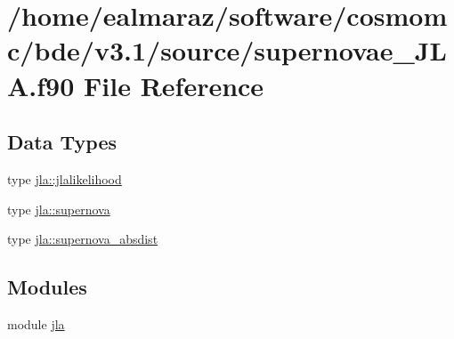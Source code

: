 \hypertarget{supernovae__JLA_8f90}{}\section{/home/ealmaraz/software/cosmomc/bde/v3.1/source/supernovae\+\_\+\+J\+LA.f90 File Reference}
\label{supernovae__JLA_8f90}
\subsection*{Data Types}
\begin{DoxyCompactItemize}
\item 
type \mbox{\hyperlink{structjla_1_1jlalikelihood}{jla\+::jlalikelihood}}
\item 
type \mbox{\hyperlink{structjla_1_1supernova}{jla\+::supernova}}
\item 
type \mbox{\hyperlink{structjla_1_1supernova__absdist}{jla\+::supernova\+\_\+absdist}}
\end{DoxyCompactItemize}
\subsection*{Modules}
\begin{DoxyCompactItemize}
\item 
module \mbox{\hyperlink{namespacejla}{jla}}
\end{DoxyCompactItemize}
